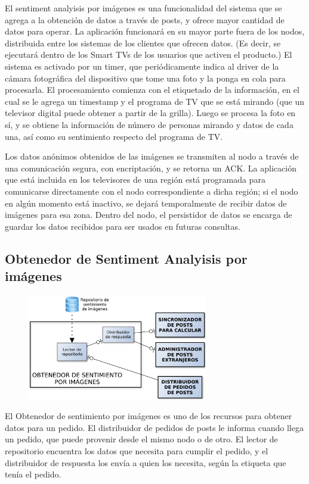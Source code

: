 El sentiment analyisis por imágenes es una funcionalidad del sistema que se agrega a la obtención de datos a través de posts, y ofrece mayor cantidad de datos para operar. La aplicación funcionará en su mayor parte fuera de los nodos, distribuida entre los sistemas de los clientes que ofrecen datos. (Es decir, se ejecutará dentro de los Smart TVs de los usuarios que activen el producto.) El sistema es activado por un timer, que periódicamente indica al driver de la cámara fotográfica del dispositivo que tome una foto y la ponga en cola para procesarla. El procesamiento comienza con el etiquetado de la información, en el cual se le agrega un timestamp y el programa de TV que se está mirando (que un televisor digital puede obtener a partir de la grilla). Luego se procesa la foto en sí, y se obtiene la información de número de personas mirando y datos de cada una, así como su sentimiento respecto del programa de TV.

Los datos anónimos obtenidos de las imágenes se transmiten al nodo a través de una comunicación segura, con encriptación, y se retorna un ACK. La aplicación que está incluida en los televisores de una región está programada para comunicarse directamente con el nodo correspondiente a dicha región; si el nodo en algún momento está inactivo, se dejará temporalmente de recibir datos de imágenes para esa zona. Dentro del nodo, el persistidor de datos se encarga de guardar los datos recibidos para ser usados en futuras consultas.

\subsection{Obtenedor de Sentiment Analyisis por imágenes}

\begin{figure}[H]
\centering
\includegraphics[width=0.7\textwidth]{graph/obtenedorimg.pdf}
\end{figure}

El Obtenedor de sentimiento por imágenes es uno de los recursos para obtener datos para un pedido. El distribuidor de pedidos de posts le informa cuando llega un pedido, que puede provenir desde el mismo nodo o de otro. El lector de repositorio encuentra los datos que necesita para cumplir el pedido, y el distribuidor de respuesta los envía a quien los necesita, según la etiqueta que tenía el pedido.

